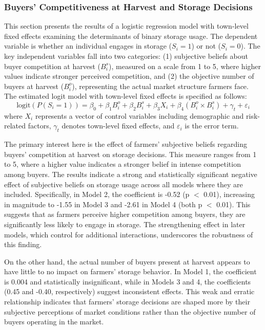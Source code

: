 \documentclass[12pt]{article}
\begin{document}
\subsubsection{Buyers' Competitiveness at Harvest and Storage Decisions}
This section presents the results of a logistic regression model with town-level fixed effects examining the determinants of binary storage usage. The dependent variable is whether an individual engages in storage ($S_i = 1$) or not ($S_i = 0$). The key independent variables fall into two categories: (1) subjective beliefs about buyer competition at harvest ($B^s_i$), measured on a scale from 1 to 5, where higher values indicate stronger perceived competition, and (2) the objective number of buyers at harvest ($B^o_i$), representing the actual market structure farmers face. The estimated logit model with town-level fixed effects is specified as follows:
\begin{equation}
\text{logit} \left( P(S_i = 1) \right) = \beta_0 + \beta_1 B^o_i + \beta_2 B^s_i + \beta_3 X_i + \beta_4 (B^o_i \times B^s_i) + \gamma_t + \varepsilon_i
\end{equation}
where $X_i$ represents a vector of control variables including demographic and risk-related factors, $\gamma_t$ denotes town-level fixed effects, and $\varepsilon_i$ is the error term.



The primary interest here is the effect of farmers' subjective beliefs regarding buyers' competition at harvest on storage decisions. This measure ranges from 1 to 5, where a higher value indicates a stronger belief in intense competition among buyers. The results indicate a strong and statistically significant negative effect of subjective beliefs on storage usage across all models where they are included. Specifically, in Model 2, the coefficient is -0.52 (p $<$ 0.01), increasing in magnitude to -1.55 in Model 3 and -2.61 in Model 4 (both p $<$ 0.01). This suggests that as farmers perceive higher competition among buyers, they are significantly less likely to engage in storage. The strengthening effect in later models, which control for additional interactions, underscores the robustness of this finding.

On the other hand, the actual number of buyers present at harvest appears to have little to no impact on farmers' storage behavior. In Model 1, the coefficient is 0.004 and statistically insignificant, while in Models 3 and 4, the coefficients (0.45 and -0.40, respectively) suggest inconsistent effects. This weak and erratic relationship indicates that farmers’ storage decisions are shaped more by their subjective perceptions of market conditions rather than the objective number of buyers operating in the market.
\end{document}

